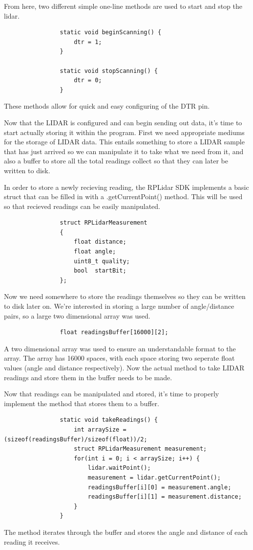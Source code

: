 				From here, two different simple one-line methods are used to start and stop the lidar.
				\begin{lstlisting}
				static void beginScanning() {
					dtr = 1;
				}
				
				static void stopScanning() {
					dtr = 0;
				}
				\end{lstlisting}
				These methods allow for quick and easy configuring of the DTR pin.
				
				Now that the LIDAR is configured and can begin sending out data, it's time to start actually storing it within the program. First we need appropriate mediums for the storage of LIDAR data. This entails something to store a LIDAR sample that has just arrived so we can manipulate it to take what we need from it, and also a buffer to store all the total readings collect so that they can later be written to disk. 
				
				In order to store a newly recieving reading, the RPLidar SDK implements a basic struct that can be filled in with a .getCurrentPoint() method. This will be used so that recieved readings can be easily manipulated.
				\begin{lstlisting}
				struct RPLidarMeasurement
				{
					float distance;
					float angle;
					uint8_t quality;
					bool  startBit;
				};
				\end{lstlisting}
				
				Now we need somewhere to store the readings themselves so they can be written to disk later on. We're interested in storing a large number of angle/distance pairs, so a large two dimensional array was used.
				\begin{lstlisting}
				float readingsBuffer[16000][2];
				\end{lstlisting}
				A two dimensional array was used to ensure an understandable format to the array. The array has 16000 spaces, with each space storing two seperate float values (angle and distance respectively). Now the actual method to take LIDAR readings and store them in the buffer needs to be made.
				
				Now that readings can be manipulated and stored, it's time to properly implement the method that stores them to a buffer.
				\begin{lstlisting}
				static void takeReadings() {
					int arraySize = (sizeof(readingsBuffer)/sizeof(float))/2;
					struct RPLidarMeasurement measurement;
					for(int i = 0; i < arraySize; i++) {
						lidar.waitPoint();
						measurement = lidar.getCurrentPoint();
						readingsBuffer[i][0] = measurement.angle;
						readingsBuffer[i][1] = measurement.distance;
					}
				}
				\end{lstlisting}
				The method iterates through the buffer and stores the angle and distance of each reading it receives.
				

